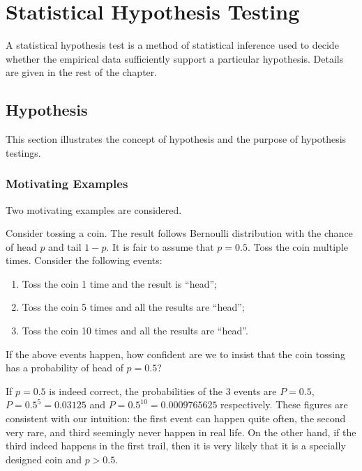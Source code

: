\chapter{Statistical Hypothesis Testing} \label{ch:ht}

A statistical hypothesis test is a method of statistical inference used to decide whether the empirical data sufficiently support a particular hypothesis. Details are given in the rest of the chapter.

\section{Hypothesis}

This section illustrates the concept of hypothesis and the purpose of hypothesis testings.

\subsection{Motivating Examples}

Two motivating examples are considered.

\begin{shortbox}

Consider tossing a coin. The result follows Bernoulli distribution with the chance of head $p$ and tail $1-p$. It is fair to assume that $p=0.5$. Toss the coin multiple times. Consider the following events:
\begin{enumerate}
	\item Toss the coin 1 time and the result is ``head'';
	\item Toss the coin 5 times and all the results are ``head'';
	\item Toss the coin 10 times and all the results are ``head''.
\end{enumerate}

If the above events happen, how confident are we to insist that the coin tossing has a probability of head of $p=0.5$?

\end{shortbox}

If $p=0.5$ is indeed correct, the probabilities of the 3 events are $P=0.5$, $P=0.5^5=0.03125$ and $P=0.5^{10}= 0.0009765625$ respectively. These figures are consistent with our intuition: the first event can happen quite often, the second very rare, and third seemingly never happen in real life. On the other hand, if the third indeed happens in the first trail, then it is very likely that it is a specially designed coin and $p>0.5$.


